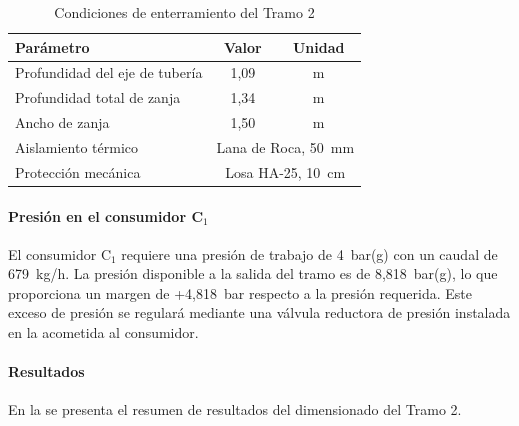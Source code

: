 \begin{table}[H]
	\centering
	\caption{Condiciones de enterramiento del Tramo 2}
	\label{tab:enterramiento-tramo2}
	\begin{tabular}{lcc}
		\toprule
		\textbf{Parámetro}             & \textbf{Valor}                          & \textbf{Unidad} \\
		\midrule
		Profundidad del eje de tubería & 1{,}09                                  & m               \\
		Profundidad total de zanja     & 1{,}34                                  & m               \\
		Ancho de zanja                 & 1{,}50                                  & m               \\
		Aislamiento térmico            & \multicolumn{2}{c}{Lana de Roca, 50~mm}                   \\
		Protección mecánica            & \multicolumn{2}{c}{Losa HA-25, 10~cm}                     \\
		\bottomrule
	\end{tabular}
\end{table}

\paragraph{Presión en el consumidor C$_1$}

El consumidor C$_1$ requiere una presión de trabajo de 4~bar(g) con un caudal de 679~kg/h. La presión disponible a la salida del tramo es de 8{,}818~bar(g), lo que proporciona un margen de +4{,}818~bar respecto a la presión requerida. Este exceso de presión se regulará mediante una válvula reductora de presión instalada en la acometida al consumidor.

\paragraph{Resultados}

En la  se presenta el resumen de resultados del dimensionado del Tramo 2.

